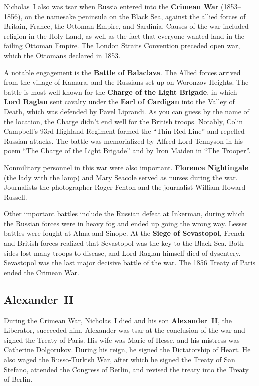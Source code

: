 Nicholas~I also was tsar when Russia entered into the \textbf{Crimean War} (1853--1856),
on the namesake peninsula on the Black Sea,
against the allied forces of Britain, France, the Ottoman Empire, and Sardinia.
Causes of the war included religion in the Holy Land,
as well as the fact that everyone wanted land in the failing Ottoman Empire.
The London Straits Convention preceded open war, which the Ottomans declared in 1853.

A notable engagement is the \textbf{Battle of Balaclava}.
The Allied forces arrived from the village of Kamara, and the Russians set up on Woronzov Heights.
The battle is most well known for the \textbf{Charge of the Light Brigade},
in which \textbf{Lord Raglan} sent cavalry under the \textbf{Earl of Cardigan} into the Valley of Death,
which was defended by Pavel Liprandi.
As you can guess by the name of the location, the Charge didn't end well for the British troops.
Notably, Colin Campbell's 93rd Highland Regiment formed the ``Thin Red Line'' and repelled Russian attacks.
The battle was memorialized by Alfred Lord Tennyson in his poem ``The Charge of the Light Brigade''
and by Iron Maiden in ``The Trooper''.

Nonmilitary personnel in this war were also important.
\textbf{Florence Nightingale} (the lady with the lamp) and Mary Seacole served as nurses during the war.
Journalists the photographer Roger Fenton and the journalist William Howard Russell.

Other important battles include the Russian defeat at Inkerman,
during which the Russian forces were in heavy fog and ended up going the wrong way.
Lesser battles were fought at Alma and Sinope.
At the \textbf{Siege of Sevastopol}, French and British forces realized that Sevastopol was the key to the Black Sea.
Both sides lost many troops to disease, and Lord Raglan himself died of dysentery.
Sevastopol was the last major decisive battle of the war.
The 1856 Treaty of Paris ended the Crimean War.

\subsection*{Alexander~II}

During the Crimean War, Nicholas~I died and his son \textbf{Alexander~II}, the Liberator, succeeded him.
Alexander was tsar at the conclusion of the war and signed the Treaty of Paris.
His wife was Marie of Hesse, and his mistress was Catherine Dolgorukov.
During his reign, he signed the Dictatorship of Heart.
He also waged the Russo-Turkish War, after which he signed the Treaty of San Stefano,
attended the Congress of Berlin, and revised the treaty into the Treaty of Berlin.

